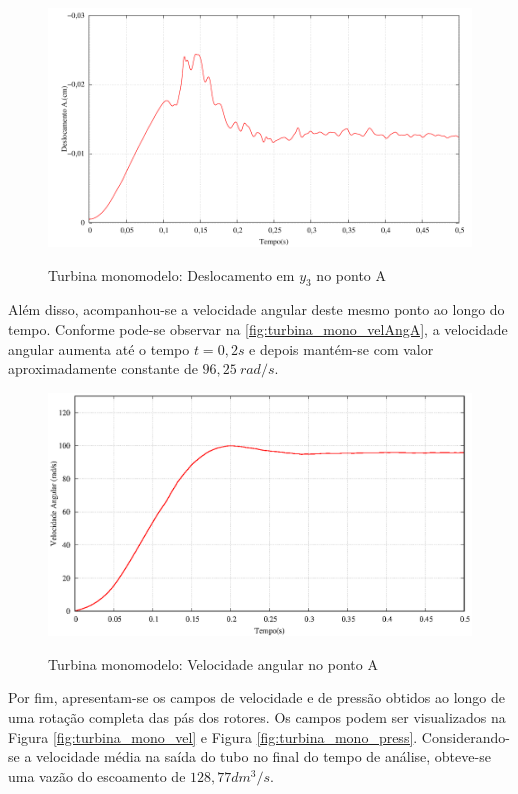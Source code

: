 \begin{figure}[!htbp]
	\caption{Turbina monomodelo: Deslocamento em $y_3$ no ponto A}
	\centering 
	\includegraphics[scale=0.6,trim=0cm 0cm 0cm 0cm, clip=true]{Imagens/Cap7/turbina_mono_deslocamento.pdf}	
	\label{fig:turbina_mono_deslA}
\end{figure}

Além disso, acompanhou-se a velocidade angular deste mesmo ponto ao longo do tempo. Conforme pode-se observar na \autoref{fig:turbina_mono_velAngA}, a velocidade angular aumenta até o tempo $t=0,2s$ e depois mantém-se com valor aproximadamente constante de $96,25 \ rad/s$.

\begin{figure}[!htbp]
	\caption{Turbina monomodelo: Velocidade angular no ponto A}
	\centering 
	\includegraphics[scale=0.6,trim=0cm 0cm 0cm 0cm, clip=true]{Imagens/Cap7/turbina_mono_velocidade_angular.eps}	
	\label{fig:turbina_mono_velAngA}
\end{figure}

Por fim, apresentam-se os campos de velocidade e de pressão obtidos ao longo de uma rotação completa das pás dos rotores. Os campos podem ser visualizados na Figura \ref{fig:turbina_mono_vel} e Figura \ref{fig:turbina_mono_press}. Considerando-se a velocidade média na saída do tubo no final do tempo de análise, obteve-se uma vazão do escoamento de $128,77dm^3/s$.

